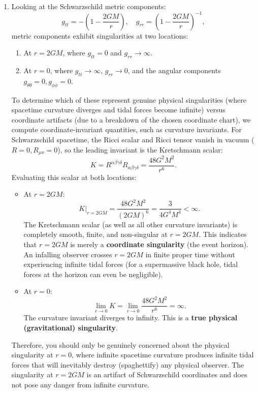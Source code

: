 \documentclass[12pt]{article}
\begin{document}
\vspace{1em}
\\
\begin{enumerate}[label=\alph*)]
\item Looking at the Schwarzschild metric components:
\begin{equation}
g_{tt} = - \left(1 - \frac{2GM}{r}\right), \quad g_{rr} = \left(1 - \frac{2GM}{r}\right)^{-1},
\end{equation}
metric components exhibit singularities at two locations:
\begin{enumerate}[label=(\roman*)]
\item At $r = 2GM$, where $g_{tt} = 0$ and $g_{rr} \to \infty$.
\item At $r = 0$, where $g_{tt} \to \infty$, $g_{rr} \to 0$, and the angular components $g_{\theta\theta}=0, g_{\phi\phi}=0$.
\end{enumerate}

To determine which of these represent genuine physical singularities (where spacetime curvature diverges and tidal forces become infinite) versus coordinate artifacts (due to a breakdown of the chosen coordinate chart), we compute coordinate-invariant quantities, such as curvature invariants. 
For Schwarzschild spacetime, the Ricci scalar and Ricci tensor vanish in vacuum ($R = 0, R_{\mu\nu} = 0$), so the leading invariant is the Kretschmann scalar:
\begin{equation}
K = R^{\alpha\beta\gamma\delta} R_{\alpha\beta\gamma\delta} = \frac{48 G^2 M^2}{r^6}.
\end{equation}
Evaluating this scalar at both locations:
\begin{itemize}
\item At $r = 2GM$:
\begin{equation}
K\Big|_{r=2GM} = \frac{48 G^2 M^2}{(2GM)^6} = \frac{3}{4 G^4 M^4} < \infty.
\end{equation}
The Kretschmann scalar (as well as all other curvature invariants) is completely smooth, finite, and non-singular at $r = 2GM$. This indicates that $r = 2GM$ is merely a \textbf{coordinate singularity} (the event horizon). An infalling observer crosses $r = 2GM$ in finite proper time without experiencing infinite tidal forces (for a supermassive black hole, tidal forces at the horizon can even be negligible).
\item At $r = 0$:
\begin{equation}
\lim_{r\to 0} K = \lim_{r\to 0} \frac{48 G^2 M^2}{r^6} = \infty.
\end{equation}
The curvature invariant diverges to infinity. This is a \textbf{true physical (gravitational) singularity}. 
\end{itemize}
Therefore, you should only be genuinely concerned about the physical singularity at \textbf{$r = 0$}, where infinite spacetime curvature produces infinite tidal forces that will inevitably destroy (spaghettify) any physical observer. The singularity at $r = 2GM$ is an artifact of Schwarzschild coordinates and does not pose any danger from infinite curvature.


\end{enumerate}
\end{document}
